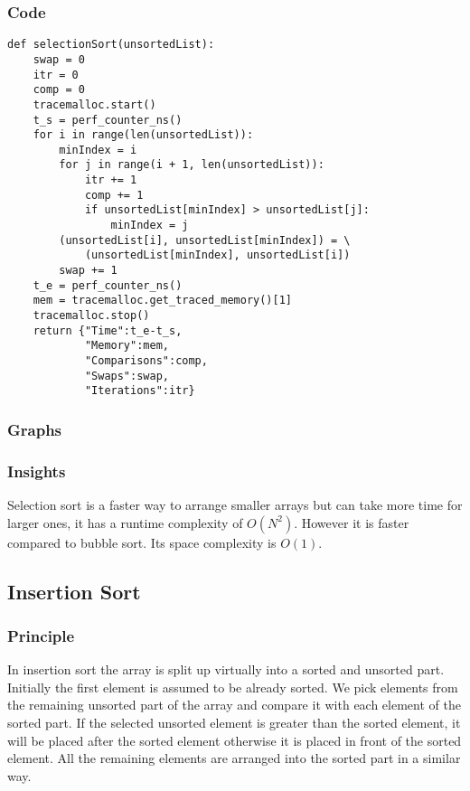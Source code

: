 \documentclass[12pt]{article}
\begin{document}
\subsubsection*{Code}
\begin{verbatim}
def selectionSort(unsortedList):
    swap = 0
    itr = 0
    comp = 0
    tracemalloc.start()
    t_s = perf_counter_ns()
    for i in range(len(unsortedList)):
        minIndex = i
        for j in range(i + 1, len(unsortedList)):
            itr += 1
            comp += 1
            if unsortedList[minIndex] > unsortedList[j]:
                minIndex = j
        (unsortedList[i], unsortedList[minIndex]) = \
            (unsortedList[minIndex], unsortedList[i])
        swap += 1
    t_e = perf_counter_ns()
    mem = tracemalloc.get_traced_memory()[1]
    tracemalloc.stop()
    return {"Time":t_e-t_s,
            "Memory":mem,
            "Comparisons":comp,
            "Swaps":swap,
            "Iterations":itr}
\end{verbatim}
\subsubsection*{Graphs}





\subsubsection*{Insights}
Selection sort is a faster way to arrange smaller arrays but can
take more time for larger ones, it has a runtime complexity of
$O(N^2)$. However it is faster compared to bubble sort. Its space
complexity is $O(1)$.
\subsection{Insertion Sort}
\subsubsection*{Principle}
In insertion sort the array is split up virtually into a sorted
and unsorted part. Initially the first element is assumed to be
already sorted. We pick elements from the remaining unsorted part
of the array and compare it with each element of the sorted part.
If the selected unsorted element is greater than the sorted
element, it will be placed after the sorted element otherwise it
is placed in front of the sorted element. All the remaining
elements are arranged into the sorted part in a similar way.
\end{document}
